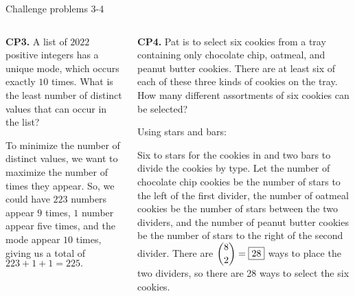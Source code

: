 \documentclass[9pt,aspectratio=169]{beamer}
\begin{document}
\begin{frame}{Challenge problems 3-4}
  \begin{columns}[T]
    \begin{column}{0.5\textwidth}
      \begin{problem}
        \textbf{CP3.} A list of $2022$ positive integers has a unique mode, which occurs exactly $10$ times. What is the least number of distinct values that can occur in the list?
      \end{problem}
      To minimize the number of distinct values, we want to maximize the number of times they appear. So, we could have $223$ numbers appear $9$ times, $1$ number appear five times, and the mode appear $10$ times, giving us a total of $223 + 1 + 1 = \boxed{225}.$
    \end{column}
    \begin{column}{0.5\textwidth}
      \begin{problem}
        \textbf{CP4.} Pat is to select six cookies from a tray containing only
        chocolate chip, oatmeal, and peanut butter cookies. There are at least six of
        each of these three kinds of cookies on the tray. How many different assortments
        of six cookies can be selected?
      \end{problem}
      Using stars and bars:
      
      Six to stars for the cookies in and two bars to divide the cookies by type. Let the number of chocolate chip cookies be the number of stars to the left of the first divider, the number of oatmeal cookies be the number of stars between the two dividers, and the number of peanut butter cookies be the number of stars to the right of the second divider. There are $\dbinom{8}{2} = \boxed{28}$ ways to place the two dividers, so there are 28 ways to select the six cookies.
    \end{column}
  \end{columns}
\end{frame}

\end{document}
